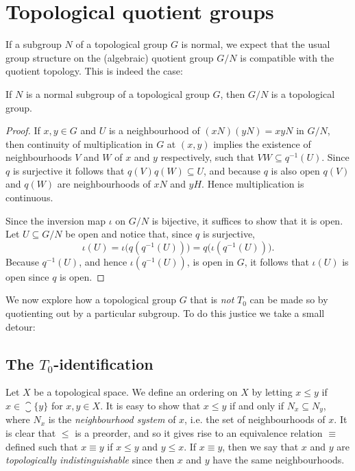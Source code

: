 \documentclass[article, a4paper, 11pt, oneside]{memoir}
\numberwithin{equation}{chapter}
\newcommand{\preim}{^{-1}}
\begin{document}
\section{Topological quotient groups}

If a subgroup $N$ of a topological group $G$ is normal, we expect that the usual group structure on the (algebraic) quotient group $G/N$ is compatible with the quotient topology. This is indeed the case:

\begin{theorem}
    If $N$ is a normal subgroup of a topological group $G$, then $G/N$ is a topological group.
\end{theorem}

\begin{proof}
    If $x,y \in G$ and $U$ is a neighbourhood of $(xN)(yN) = xyN$ in $G/N$, then continuity of multiplication in $G$ at $(x,y)$ implies the existence of neighbourhoods $V$ and $W$ of $x$ and $y$ respectively, such that $VW \subseteq q\preim(U)$. Since $q$ is surjective it follows that $q(V) q(W) \subseteq U$, and because $q$ is also open $q(V)$ and $q(W)$ are neighbourhoods of $xN$ and $yH$. Hence multiplication is continuous.

    Since the inversion map $\iota$ on $G/N$ is bijective, it suffices to show that it is open. Let $U \subseteq G/N$ be open and notice that, since $q$ is surjective,
    \begin{equation*}
        \iota(U)
            = \iota \bigl( q(q\preim(U)) \bigr)
            = q \bigl( \iota(q\preim(U)) \bigr).
    \end{equation*}
    Because $q\preim(U)$, and hence $\iota(q\preim(U))$, is open in $G$, it follows that $\iota(U)$ is open since $q$ is open.
\end{proof}

We now explore how a topological group $G$ that is \emph{not} $T_0$ can be made so by quotienting out by a particular subgroup. To do this justice we take a small detour:

\subsection{The $T_0$-identification}

Let $X$ be a topological space. We define an ordering on $X$ by letting $x \leq y$ if $x \in \closure{\{y\}}$ for $x,y \in X$. It is easy to show that $x \leq y$ if and only if $N_x \subseteq N_y$, where $N_x$ is the \emph{neighbourhood system} of $x$, i.e. the set of neighbourhoods of $x$. It is clear that $\leq$ is a preorder, and so it gives rise to an equivalence relation $\equiv$ defined such that $x \equiv y$ if $x \leq y$ and $y \leq x$. If $x \equiv y$, then we say that $x$ and $y$ are \emph{topologically indistinguishable} since then $x$ and $y$ have the same neighbourhoods.
\end{document}
